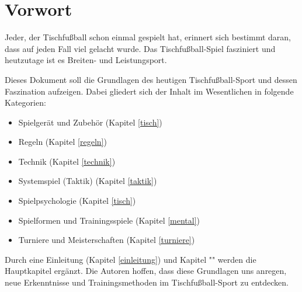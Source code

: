 \chapter*{Vorwort}

Jeder, der Tischfußball schon einmal gespielt hat, erinnert sich bestimmt daran, dass auf jeden Fall viel gelacht wurde.
Das Tischfußball-Spiel fasziniert und heutzutage ist es Breiten- und Leistungsport. 

Dieses Dokument soll die Grundlagen des heutigen Tischfußball-Sport und dessen Faszination aufzeigen. Dabei gliedert sich der Inhalt im Wesentlichen in folgende Kategorien:
\begin{itemize}
\item Spielgerät und Zubehör (Kapitel \ref{tisch})
\item Regeln (Kapitel \ref{regeln})
\item Technik (Kapitel \ref{technik})
\item Systemspiel (Taktik) (Kapitel \ref{taktik})
\item Spielpsychologie (Kapitel \ref{tisch})
\item Spielformen und Trainingsspiele (Kapitel \ref{mental})
\item Turniere und Meisterschaften (Kapitel \ref{turniere})
\end{itemize}
Durch eine Einleitung (Kapitel \ref{einleitung}) und Kapitel "" werden die Hauptkapitel ergänzt. 
Die Autoren hoffen, dass diese Grundlagen uns anregen, neue Erkenntnisse und Trainingsmethoden im Tischfußball-Sport zu entdecken.
